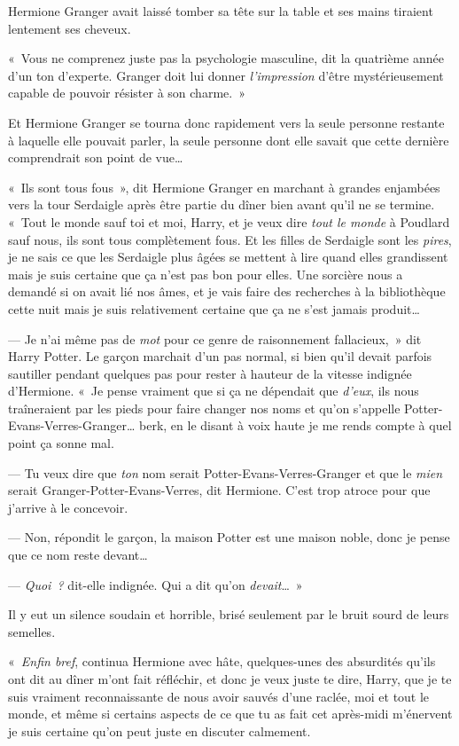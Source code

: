 Hermione Granger avait laissé tomber sa tête sur la table et ses mains tiraient lentement ses cheveux.

«~Vous ne comprenez juste pas la psychologie masculine, dit la quatrième année d'un ton d'experte. Granger doit lui donner \emph{l'impression} d'être mystérieusement capable de pouvoir résister à son charme.~»


Et Hermione Granger se tourna donc rapidement vers la seule personne restante à laquelle elle pouvait parler, la seule personne dont elle savait que cette dernière comprendrait son point de vue…

«~Ils sont tous fous~», dit Hermione Granger en marchant à grandes enjambées vers la tour Serdaigle après être partie du dîner bien avant qu'il ne se termine. «~Tout le monde sauf toi et moi, Harry, et je veux dire \emph{tout le monde} à Poudlard sauf nous, ils sont tous complètement fous. Et les filles de Serdaigle sont les \emph{pires}, je ne sais ce que les Serdaigle plus âgées se mettent à lire quand elles grandissent mais je suis certaine que ça n'est pas bon pour elles. Une sorcière nous a demandé si on avait lié nos âmes, et je vais faire des recherches à la bibliothèque cette nuit mais je suis relativement certaine que ça ne s'est jamais produit…

--- Je n'ai même pas de \emph{mot} pour ce genre de raisonnement fallacieux,~» dit Harry Potter. Le garçon marchait d'un pas normal, si bien qu'il devait parfois sautiller pendant quelques pas pour rester à hauteur de la vitesse indignée d'Hermione. «~Je pense vraiment que si ça ne dépendait que \emph{d'eux}, ils nous traîneraient par les pieds pour faire changer nos noms et qu'on s'appelle Potter-Evans-Verres-Granger… berk, en le disant à voix haute je me rends compte à quel point ça sonne mal.

--- Tu veux dire que \emph{ton} nom serait Potter-Evans-Verres-Granger et que le \emph{mien} serait Granger-Potter-Evans-Verres, dit Hermione. C'est trop atroce pour que j'arrive à le concevoir.

--- Non, répondit le garçon, la maison Potter est une maison noble, donc je pense que ce nom reste devant…

--- \emph{Quoi~?} dit-elle indignée. Qui a dit qu'on \emph{devait}…~»

Il y eut un silence soudain et horrible, brisé seulement par le bruit sourd de leurs semelles.

«~\emph{Enfin bref}, continua Hermione avec hâte, quelques-unes des absurdités qu'ils ont dit au dîner m'ont fait réfléchir, et donc je veux juste te dire, Harry, que je te suis vraiment reconnaissante de nous avoir sauvés d'une raclée, moi et tout le monde, et même si certains aspects de ce que tu as fait cet après-midi m'énervent je suis certaine qu'on peut juste en discuter calmement.


